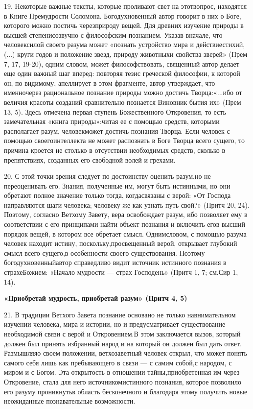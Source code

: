 \documentclass[a5paper,10pt]{article}
\begin{document}
19. Некоторые важные тексты, которые проливают свет на этотвопрос, находятся в
Книге Премудрости Соломона. Богодухновенный автор говорит в них о Боге,
которого можно постичь черезприроду вещей. Для древних изучение природы в
высшей степенисозвучно с философским познанием. Указав вначале, что
человексилой своего разума может «познать устройство мира и действиестихий,
(...) круги годов и положение звезд, природу животныхи свойства зверей» (Прем
7, 17, 19-20), одним словом, может философствовать, священный автор делает еще
один важный шаг вперед: повторяя тезис греческой философии, к которой он,
по-видимому, апеллирует в этом фрагменте, автор утверждает, что именночерез
рациональное познание природы можно достичь Творца:«...ибо от величия красоты
созданий сравнительно познается Виновник бытия их» (Прем 13, 5). Здесь отмечена
первая ступень Божественного Откровения, то есть замечательная «книга
природы»:читая ее с помощью средств, которыми располагает разум, человекможет
достичь познания Творца. Если человек с помощью своегоинтеллекта не может
распознать в Боге Творца всего сущего, то причина кроется не столько в
отсутствии необходимых средств, сколько в препятствиях, созданных его свободной
волей и грехами.

20. С этой точки зрения следует по достоинству оценить разум,но не
переоценивать его. Знания, полученные им, могут быть истинными, но они обретают
полное значение только тогда, когдасвязаны с верой: «От Господа направляются
шаги человека; человеку же как узнать путь свой?» (Притч 20, 24). Поэтому,
согласно Ветхому Завету, вера освобождает разум, ибо позволяет ему в
соответствии с его принципами найти объект познания и включить егов высший
порядок вещей, в котором все обретает смысл. Однимсловом, с помощью разума
человек находит истину, поскольку,просвещенный верой, открывает глубокий смысл
всего сущего,в особенности своего существования. Поэтому богодухновенныйавтор
справедливо видит источник истинного познания в страхеБожием: «Начало мудрости
— страх Господень» (Притч 1, 7; см.Сир 1, 14).

\textbf{«Приобретай мудрость, приобретай разум» (Притч 4, 5)}

21. В традиции Ветхого Завета познание основано не только навнимательном
изучении человека, мира и истории, но и предусматривает существование
необходимой связи с верой и Откровением.В этом заключается вызов, который
должен был принять избранный народ и на который он должен был дать ответ.
Размышляяо своем положении, ветхозаветный человек открыл, что может понять
самого себя лишь как пребывающего в связи — с самим собой,с народом, с миром и
с Богом. Эта открытость в отношении тайны,приобретенная им через Откровение,
стала для него источникомистинного познания, которое позволило его разуму
проникнутьв область бесконечного и благодаря этому получить новые неожиданные
познавательные возможности.
\end{document}
